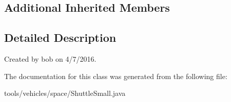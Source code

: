 \subsection*{Additional Inherited Members}


\subsection{Detailed Description}
Created by bob on 4/7/2016. 

The documentation for this class was generated from the following file\+:\begin{DoxyCompactItemize}
\item 
tools/vehicles/space/Shuttle\+Small.\+java\end{DoxyCompactItemize}
